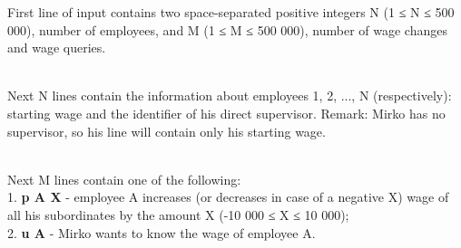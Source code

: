 First line of input contains two space-separated positive integers N (1 ≤ N ≤ 500 000), number of employees, and M (1 ≤ M ≤ 500 000), number of wage changes and wage queries.


\\Next N lines contain the information about employees 1, 2, ..., N (respectively): starting wage and the identifier of his direct supervisor. Remark: Mirko has no supervisor, so his line will contain only his starting wage.


\\Next M lines contain one of the following:
\\1. \textbf{ p A X } - employee A increases (or decreases in case of a negative X) wage of all his subordinates by the amount X (-10 000 ≤ X ≤ 10 000);
\\2. \textbf{ u A } - Mirko wants to know the wage of employee A.

\